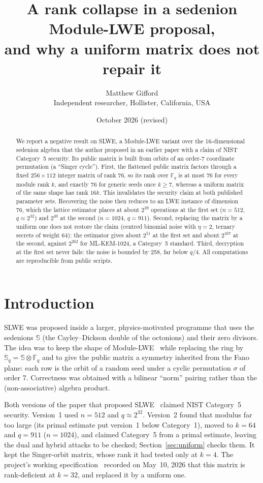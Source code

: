 \documentclass[11pt]{article}
\title{A rank collapse in a sedenion Module-LWE proposal,\\ and why a uniform matrix does not repair it}
\author{Matthew Gifford\\ \small Independent researcher, Hollister, California, USA}
\date{\small October 2026 (revised)}
\theoremstyle{remark}
\newcommand{\F}{\mathbb{F}}
\newcommand{\Sed}{\mathbb{S}}
\begin{document}
\maketitle

\begin{abstract}
We report a negative result on SLWE, a Module-LWE variant over the 16-dimensional sedenion algebra that the
author proposed in an earlier paper with a claim of NIST Category~5 security. Its public matrix is built from orbits of an order-7 coordinate permutation (a
``Singer cycle''). First, the flattened public matrix factors through a fixed $256\times112$ integer matrix of rank 76,
so its rank over $\F_q$ is at most 76 for every module rank $k$, and exactly 76 for generic seeds once $k\ge 7$, whereas a
uniform matrix of the same shape has rank $16k$. This invalidates the security claim at both published parameter sets.
Recovering the noise then reduces to an LWE instance of dimension 76, which the lattice estimator places at about
$2^{39}$ operations at the first set ($n=512$, $q\approx2^{32}$) and $2^{40}$ at the second ($n=1024$, $q=911$). Second,
replacing the matrix by a uniform one does not restore the claim (centred binomial noise with $\eta=2$, ternary secrets
of weight 64): the estimator gives about $2^{51}$ at the first set and about $2^{167}$ at the second, against $2^{262}$
for ML-KEM-1024, a Category~5 standard. Third, decryption at the first set never fails: the noise is bounded by 258, far
below $q/4$.
All computations are reproducible from public scripts.
\end{abstract}

\section{Introduction}

SLWE was proposed inside a larger, physics-motivated programme that uses the sedenions $\Sed$ (the Cayley--Dickson
double of the octonions) and their zero divisors. The idea was to keep the shape of Module-LWE~\cite{Regev,LS15} while replacing the ring by
$\Sed_q=\Sed\otimes\F_q$ and to give the public matrix a symmetry inherited from the Fano plane: each row is the orbit of
a random seed under a cyclic permutation $\sigma$ of order 7. Correctness was obtained with a bilinear ``norm'' pairing
rather than the (non-associative) algebra product.

Both versions of the paper that proposed SLWE~\cite{Gif26a} claimed NIST Category~5 security. Version~1 used $n=512$
and $q\approx2^{32}$. Version~2 found that modulus far too large (its primal estimate put version~1 below Category~1),
moved to $k=64$ and $q=911$ ($n=1024$), and claimed Category~5 from a primal estimate, leaving the dual and hybrid
attacks to be checked; Section~\ref{sec:uniform} checks them. It kept the Singer-orbit matrix, whose rank it had tested only at $k=4$. The project's working
specification~\cite{Gif26b} recorded on May~10, 2026 that this matrix is rank-deficient at $k=32$, and replaced it by a
uniform one.
\end{document}
